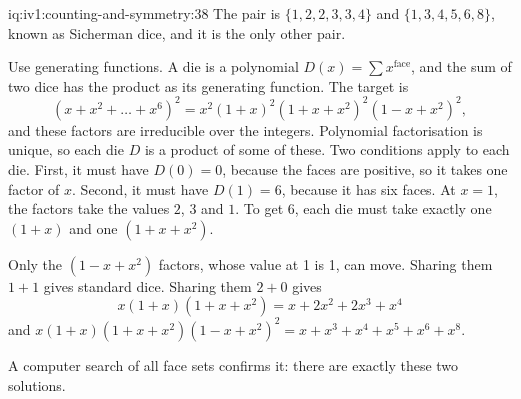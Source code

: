 \begin{solution}{iq:iv1:counting-and-symmetry:38}
The pair is $\{1, 2, 2, 3, 3, 4\}$ and $\{1, 3, 4, 5, 6, 8\}$, known as Sicherman dice, and it is the only other pair.

Use generating functions. A die is a polynomial $D(x) = \sum x^{\text{face}}$, and the sum of two dice has the product as its generating function. The target is
\[
(x + x^2 + \dots + x^6)^2 = x^2 (1 + x)^2 (1 + x + x^2)^2 (1 - x + x^2)^2,
\]
and these factors are irreducible over the integers. Polynomial factorisation is unique, so each die $D$ is a product of some of these. Two conditions apply to each die. First, it must have $D(0) = 0$, because the faces are positive, so it takes one factor of $x$. Second, it must have $D(1) = 6$, because it has six faces. At $x = 1$, the factors take the values $2$, $3$ and $1$. To get 6, each die must take exactly one $(1 + x)$ and one $(1 + x + x^2)$.

Only the $(1 - x + x^2)$ factors, whose value at 1 is 1, can move. Sharing them $1 + 1$ gives standard dice. Sharing them $2 + 0$ gives
\[
x(1 + x)(1 + x + x^2) = x + 2x^2 + 2x^3 + x^4
\]
and $x(1 + x)(1 + x + x^2)(1 - x + x^2)^2 = x + x^3 + x^4 + x^5 + x^6 + x^8$.

A computer search of all face sets confirms it: there are exactly these two solutions.

\end{solution}

